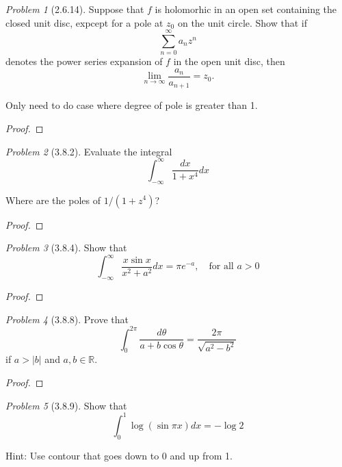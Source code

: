\documentclass[10pt]{article}
\newcommand{\sk}{\vskip 10mm}
\newcommand{\bb}[1]{\mathbb{#1}}
\theoremstyle{remark}
\newtheorem{problem}{Problem}
\theoremstyle{remark}
\begin{document}
\begin{problem}[2.6.14]
  Suppose that $f$ is holomorhic in an open set containing the closed unit disc,
  expcept for a pole at $z_0$ on the unit circle. Show that if
  \[
    \sum_{n=0}^\infty a_n z^n
  \]
  denotes the power series expansion of $f$ in the open unit disc, then
  \[
    \lim_{n\rightarrow\infty}\frac{a_n}{a_{n+1}}=z_0.
  \]
  
  Only need to do case where degree of pole is greater than 1.
\end{problem}

\begin{proof}
  
\end{proof}

\sk

\begin{problem}[3.8.2]
  Evaluate the integral
  \[
    \int_{-\infty}^\infty \frac{dx}{1+x^4}dx
  \]

  Where are the poles of $1/(1+z^4)$?
\end{problem}

\begin{proof}
  
\end{proof}

\sk

\begin{problem}[3.8.4]
  Show that
  \[
    \int_{-\infty}^\infty\frac{x\sin x}{x^2+a^2}dx=\pi e^{-a},\quad \text{for all $a>0$}
  \]
\end{problem}

\begin{proof}
  
\end{proof}

\sk

\begin{problem}[3.8.8]
  Prove that
  \[
    \int_0^{2\pi}\frac{d\theta}{a+b\cos\theta}=\frac{2\pi}{\sqrt{a^2-b^2}}
  \]
  if $a>|b|$ and $a,b\in\bb{R}$.
\end{problem}

\begin{proof}
  
\end{proof}

\sk

\begin{problem}[3.8.9]
  Show that
  \[
    \int_0^1\log(\sin\pi x)dx = -\log 2
  \]

  Hint: Use contour that goes down to 0 and up from 1.
\end{problem}
\end{document}
